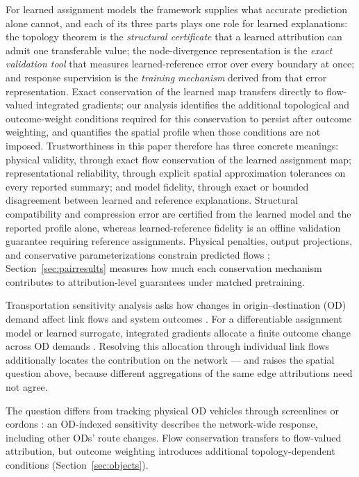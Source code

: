 \documentclass[a4paper,fleqn]{cas-sc}
\begin{document}
For learned assignment models the framework supplies what accurate
prediction alone cannot, and each of its three parts plays one role for
learned explanations: the topology theorem is the \emph{structural
certificate} that a learned attribution can admit one transferable
value; the node-divergence representation is the \emph{exact validation
tool} that measures learned-reference error over every boundary at
once; and response supervision is the \emph{training mechanism} derived
from that error representation. Exact conservation of the learned map
transfers directly to flow-valued integrated gradients; our analysis
identifies the additional topological and outcome-weight conditions
required for this conservation to persist after outcome weighting, and
quantifies the spatial profile when those conditions are not imposed.
Trustworthiness in this paper therefore has three concrete meanings:
physical validity, through exact flow conservation of the learned
assignment map; representational reliability, through explicit spatial
approximation tolerances on every reported summary; and model fidelity,
through exact or bounded disagreement between learned and reference
explanations. Structural compatibility and compression error are
certified from the learned model and the reported profile alone,
whereas learned-reference fidelity is an offline validation guarantee
requiring reference assignments. Physical penalties, output
projections, and conservative parameterizations constrain predicted
flows
\citep{raissi2019physics,shi2021physics,valente2025physics,richterpowell2022neural};
Section~\ref{sec:pairresults} measures how much each conservation
mechanism contributes to attribution-level guarantees under matched
pretraining.

Transportation sensitivity analysis asks how changes in origin--destination
(OD) demand affect link flows and system outcomes
\citep{tobin1988sensitivity,josefsson2007sensitivity,patriksson2003aggregated}.
For a differentiable assignment model or learned surrogate, integrated
gradients allocate a finite outcome change across OD demands
\citep{sundararajan2017axiomatic}. Resolving this allocation through
individual link flows additionally locates the contribution on the
network --- and raises the spatial question above, because different
aggregations of the same edge attributions need not agree.

The question differs from tracking physical OD vehicles through screenlines
or cordons \citep{sheffi1985urban,vanzuylen1980most,bar2002origin}:
an OD-indexed sensitivity describes the network-wide response,
including other ODs' route changes. Flow conservation transfers to
flow-valued attribution, but outcome weighting introduces additional
topology-dependent conditions (Section~\ref{sec:objects}).
\end{document}
